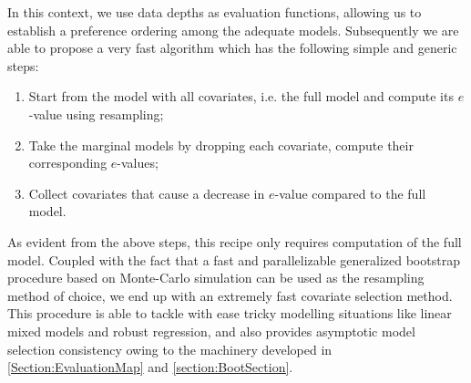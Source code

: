 
%



In this context, we use data depths as evaluation functions, allowing us to establish a preference ordering among the adequate models. Subsequently we are able to propose a very fast algorithm which has the following simple and generic steps:
%
\begin{enumerate}
\item Start from the model with all covariates, i.e. the full model and compute its $e$-value using resampling;
\item Take the marginal models by dropping each covariate, compute their corresponding $e$-values;
\item Collect covariates that cause a decrease in $e$-value compared to the full model.
\end{enumerate}
%
As evident from the above steps, this recipe only requires computation of the full model. Coupled with the fact that a fast and parallelizable generalized bootstrap procedure \citep{ChatterjeeBose05} based on Monte-Carlo simulation can be used as the resampling method of choice, we end up with an extremely fast covariate selection method. This procedure is able to tackle with ease tricky modelling situations like linear mixed models and robust regression, and also provides asymptotic model selection consistency owing to the machinery developed in \ref{Section:EvaluationMap} and \ref{section:BootSection}.

